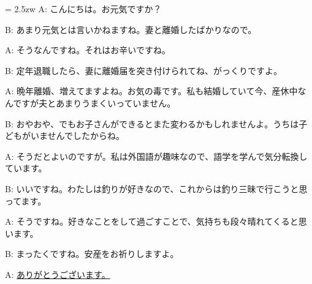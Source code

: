 \documentclass[11pt]{amsart}
\title{}
\author{}
\newenvironment{hangall}[1]{\hangindent = 2.5zw\everypar{\hangindent = 2.5zw}}{}
\begin{document}
\maketitle
\begin{hangall}{}%
A: こんにちは。お元気ですか？

B: あまり元気とは言いかねますね。妻と離婚したばかりなので。

A: そうなんですね。それはお辛いですね。

B: 定年退職したら、妻に離婚届を突き付けられてね、がっくりですよ。

A: 晩年離婚、増えてますよね。お気の毒です。私も結婚していて今、産休中なんですが夫とあまりうまくいっていません。

B: おやおや、でもお子さんができるとまた変わるかもしれませんよ。うちは子どもがいませんでしたからね。

A: そうだとよいのですが。私は外国語が趣味なので、語学を学んで気分転換しています。

B: いいですね。わたしは釣りが好きなので、これからは釣り三昧で行こうと思ってます。

A: そうですね。好きなことをして過ごすことで、気持ちも段々晴れてくると思います。

B: まったくですね。安産をお祈りしますよ。

A: \ul{ありがとうございます。}\end{hangall}
\end{document}
